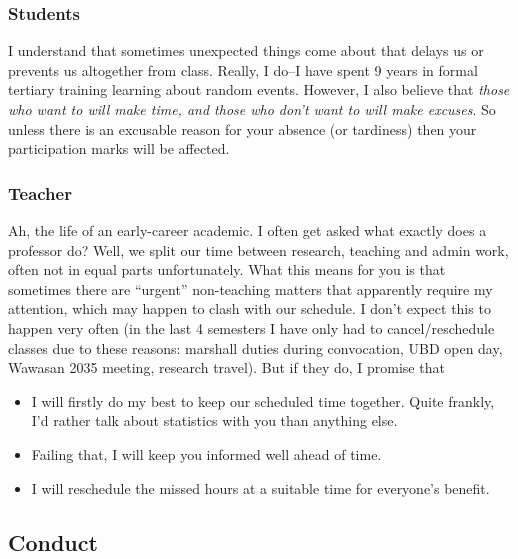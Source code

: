 \documentclass[
]{book}
\providecommand{\tightlist}{%
  \setlength{\itemsep}{0pt}\setlength{\parskip}{0pt}}
\theoremstyle{definition}
\theoremstyle{definition}
\theoremstyle{definition}
\theoremstyle{definition}
\theoremstyle{remark}
\begin{document}
\hypertarget{students}{%
\subsubsection*{Students}\label{students}}

I understand that sometimes unexpected things come about that delays us or prevents us altogether from class. Really, I do--I have spent 9 years in formal tertiary training learning about random events.
However, I also believe that \emph{those who want to will make time, and those who don't want to will make excuses}.
So unless there is an excusable reason for your absence (or tardiness) then your participation marks will be affected.

\hypertarget{teacher}{%
\subsubsection*{Teacher}\label{teacher}}

Ah, the life of an early-career academic.
I often get asked what exactly does a professor do?
Well, we split our time between research, teaching and admin work, often not in equal parts unfortunately.
What this means for you is that sometimes there are ``urgent'' non-teaching matters that apparently require my attention, which may happen to clash with our schedule.
I don't expect this to happen very often (in the last 4 semesters I have only had to cancel/reschedule classes due to these reasons: marshall duties during convocation, UBD open day, Wawasan 2035 meeting, research travel).
But if they do, I promise that

\begin{itemize}
\tightlist
\item
  I will firstly do my best to keep our scheduled time together. Quite frankly, I'd rather talk about statistics with you than anything else.
\item
  Failing that, I will keep you informed well ahead of time.
\item
  I will reschedule the missed hours at a suitable time for everyone's benefit.
\end{itemize}

\hypertarget{conduct}{%
\subsection*{Conduct}\label{conduct}}
\end{document}
